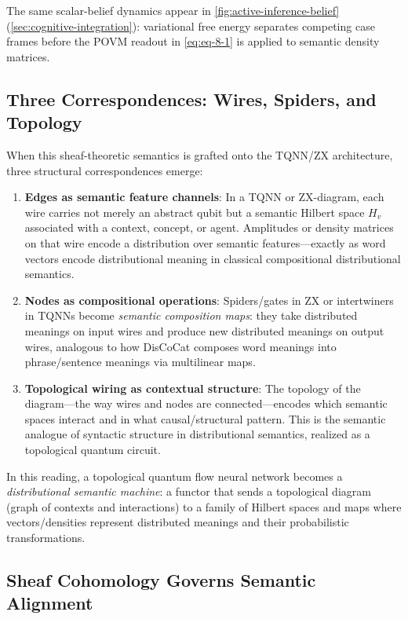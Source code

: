 \documentclass[
]{article}
\begin{document}
The same scalar-belief dynamics appear in
\autoref{fig:active-inference-belief}
(\autoref{sec:cognitive-integration}): variational free energy separates
competing case frames before the POVM readout in \autoref{eq:eq-8-1} is
applied to semantic density matrices.

\subsection{Three Correspondences: Wires, Spiders, and
Topology}\label{three-correspondences-wires-spiders-and-topology}

When this sheaf-theoretic semantics is grafted onto the TQNN/ZX
architecture, three structural correspondences emerge:

\begin{enumerate}
\def\labelenumi{\arabic{enumi}.}
\item
  \textbf{Edges as semantic feature channels}: In a TQNN or ZX-diagram,
  each wire carries not merely an abstract qubit but a semantic Hilbert
  space \(H_v\) associated with a context, concept, or agent. Amplitudes
  or density matrices on that wire encode a distribution over semantic
  features---exactly as word vectors encode distributional meaning in
  classical compositional distributional semantics.
\item
  \textbf{Nodes as compositional operations}: Spiders/gates in ZX or
  intertwiners in TQNNs become \emph{semantic composition maps}: they
  take distributed meanings on input wires and produce new distributed
  meanings on output wires, analogous to how DisCoCat composes word
  meanings into phrase/sentence meanings via multilinear maps.
\item
  \textbf{Topological wiring as contextual structure}: The topology of
  the diagram---the way wires and nodes are connected---encodes which
  semantic spaces interact and in what causal/structural pattern. This
  is the semantic analogue of syntactic structure in distributional
  semantics, realized as a topological quantum circuit.
\end{enumerate}

In this reading, a topological quantum flow neural network becomes a
\emph{distributional semantic machine}: a functor that sends a
topological diagram (graph of contexts and interactions) to a family of
Hilbert spaces and maps where vectors/densities represent distributed
meanings and their probabilistic transformations.

\subsection{Sheaf Cohomology Governs Semantic
Alignment}\label{sheaf-cohomology-governs-semantic-alignment}
\end{document}
